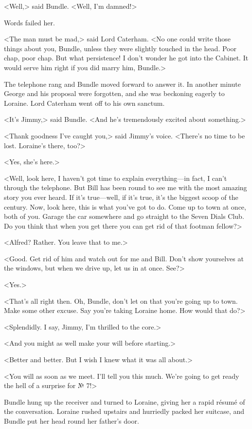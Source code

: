 <Well,> said Bundle. <Well, I'm damned!>

Words failed her.

<The man must be mad,> said Lord Caterham. <No one could write those things about you, Bundle, unless they were slightly touched in the head. Poor chap, poor chap. But what persistence! I don't wonder he got into the Cabinet. It would serve him right if you did marry him, Bundle.>

The telephone rang and Bundle moved forward to answer it. In another minute George and his proposal were forgotten, and she was beckoning eagerly to Loraine. Lord Caterham went off to his own sanctum.

<It's Jimmy,> said Bundle. <And he's tremendously excited about something.>

<Thank goodness I've caught you,> said Jimmy's voice. <There's no time to be lost. Loraine's there, too?>

<Yes, she's here.>

<Well, look here, I haven't got time to explain everything—in fact, I can't through the telephone. But Bill has been round to see me with the most amazing story you ever heard. If it's true—well, if it's true, it's the biggest scoop of the century. Now, look here, this is what you've got to do. Come up to town at once, both of you. Garage the car somewhere and go straight to the Seven Dials Club. Do you think that when you get there you can get rid of that footman fellow?>

<Alfred? Rather. You leave that to me.>

<Good. Get rid of him and watch out for me and Bill. Don't show yourselves at the windows, but when we drive up, let us in at once. See?>

<Yes.>

<That's all right then. Oh, Bundle, don't let on that you're going up to town. Make some other excuse. Say you're taking Loraine home. How would that do?>

<Splendidly. I say, Jimmy, I'm thrilled to the core.>

<And you might as well make your will before starting.>

<Better and better. But I wish I knew what it was all about.>

<You will as soon as we meet. I'll tell you this much. We're going to get ready the hell of a surprise for № 7!>

Bundle hung up the receiver and turned to Loraine, giving her a rapid résumé of the conversation. Loraine rushed upstairs and hurriedly packed her suitcase, and Bundle put her head round her father's door.

